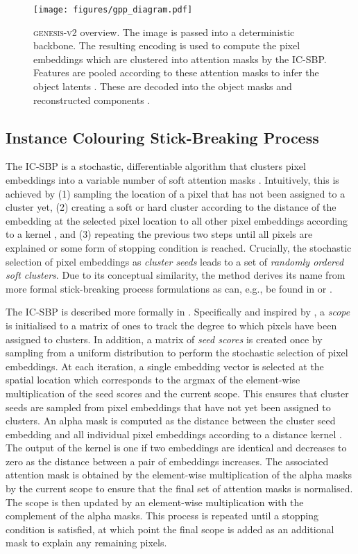 \documentclass{article}
\begin{document}
\begin{figure}
	\centering
	\texttt{[image: figures/gpp\_diagram.pdf]}
	\caption{\textsc{genesis-v2} overview. The image  is passed into a deterministic backbone. The resulting encoding is used to compute the pixel embeddings  which are clustered into attention masks  by the IC-SBP. Features are pooled according to these attention masks to infer the object latents . These are decoded into the object masks  and reconstructed components .}
	\label{fig:gpp:model_diagram}
\end{figure}


\subsection{Instance Colouring Stick-Breaking Process}
\label{sec:icsbp}
The IC-SBP is a stochastic, differentiable algorithm that clusters pixel embeddings \mbox{} into a variable number of soft attention masks .
Intuitively, this is achieved by (1) sampling the location  of a pixel that has not been assigned to a cluster yet, (2) creating a soft or hard cluster according to the distance of the embedding  at the selected pixel location to all other pixel embeddings according to a kernel , and (3) repeating the previous two steps until all pixels are explained or some form of stopping condition is reached.
Crucially, the stochastic selection of pixel embeddings as \emph{cluster seeds} leads to a set of \emph{randomly ordered soft clusters}.
Due to its conceptual similarity, the method derives its name from more formal stick-breaking process formulations as can, e.g., be found in \citet{yuan2019generative} or \citet{nalisnick2016stick}.

The IC-SBP is described more formally in .
Specifically and inspired by \citet{burgess2019monet}, a \emph{scope}  is initialised to a matrix of ones  to track the degree to which pixels have been assigned to clusters.
In addition, a matrix of \emph{seed scores} is created once by sampling from a uniform distribution  to perform the stochastic selection of pixel embeddings.
At each iteration, a single embedding vector  is selected at the spatial location  which corresponds to the argmax of the element-wise multiplication of the seed scores and the current scope.
This ensures that cluster seeds are sampled from pixel embeddings that have not yet been assigned to clusters.
An alpha mask  is computed as the distance between the cluster seed embedding  and all individual pixel embeddings according to a distance kernel .
The output of the kernel  is one if two embeddings are identical and decreases to zero as the distance between a pair of embeddings increases.
The associated attention mask  is obtained by the element-wise multiplication of the alpha masks by the current scope to ensure that the final set of attention masks is normalised.
The scope is then updated by an element-wise multiplication with the complement of the alpha masks.
This process is repeated until a stopping condition is satisfied, at which point the final scope is added as an additional mask to explain any remaining pixels.
\end{document}
